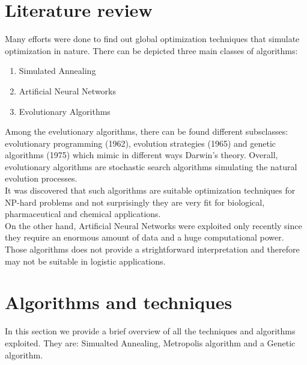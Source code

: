 \documentclass{article}
\begin{document}
\section{Literature review}
Many efforts were done to find out global optimization techniques that simulate optimization in nature. There can be depicted three main classes of algorithms:
\begin{enumerate}
\item Simulated Annealing
\item Artificial Neural Networks
\item Evolutionary Algorithms
\end{enumerate}
Among the evelutionary algorithms, there can be found different subsclasses: evolutionary programming (1962), evolution strategies (1965) and genetic algorithms (1975) which mimic in different ways Darwin's theory.  Overall, evolutionary algorithms are stochastic search algorithms simulating the natural evolution processes. \cite{gareview}\\
It was discovered that such algorithms are suitable optimization techniques for NP-hard problems and not surprisingly they are very fit for biological, pharmaceutical and chemical applications. \\
On the other hand, Artificial Neural Networks were exploited only recently since they require an enormous amount of data and a huge computational power. Those algorithms does not provide a strightforward interpretation and therefore may not be suitable in logistic applications. \cite{annreview}

\section{Algorithms and techniques} \label{algorithms}
In this section we provide a brief overview of all the techniques and algorithms exploited. They are: Simualted Annealing, Metropolis algorithm and a Genetic algorithm.
\end{document}
